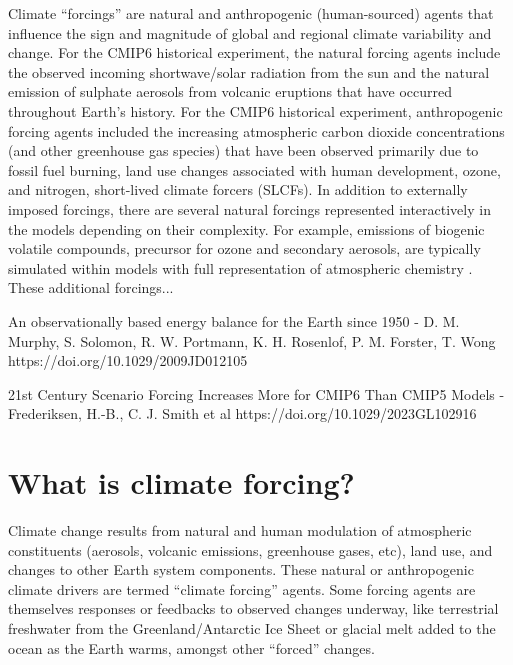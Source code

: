 \documentclass[gmd, preprint]{copernicus}
\newcommand{\mycomment}[1]{}
\begin{document}


\mycomment{Details about CMIP5 forcings can be found in https://pcmdi.llnl.gov/mips/cmip5/docs/Experiment_design_addendum.pdf}


\introduction  %
Climate “forcings” are natural and anthropogenic (human-sourced) agents that influence the sign and magnitude of global and regional climate variability and change. For the CMIP6 historical experiment, the natural forcing agents include the observed incoming shortwave/solar radiation from the sun and the natural emission of sulphate aerosols from volcanic eruptions that have occurred throughout Earth’s history. For the CMIP6 historical experiment, anthropogenic forcing agents included the increasing atmospheric carbon dioxide concentrations (and other greenhouse gas species) that have been observed primarily due to fossil fuel burning, land use changes associated with human development, ozone, and nitrogen, short-lived climate forcers (SLCFs). In addition to externally imposed forcings, there are several natural forcings represented interactively in the models depending on their complexity. For example, emissions of biogenic volatile compounds, precursor for ozone and secondary aerosols, are typically simulated within models with full representation of atmospheric chemistry \citep{thornhill_climate-driven_2021,young_pre-industrial_2013}. These additional forcings...


An observationally based energy balance for the Earth since 1950 - D. M. Murphy, S. Solomon, R. W. Portmann, K. H. Rosenlof, P. M. Forster, T. Wong https://doi.org/10.1029/2009JD012105

21st Century Scenario Forcing Increases More for CMIP6 Than CMIP5 Models - Frederiksen, H.-B., C. J. Smith et al https://doi.org/10.1029/2023GL102916



\section{What is climate forcing?}
Climate change results from natural and human modulation of atmospheric constituents (aerosols, volcanic emissions, greenhouse gases, etc), land use, and changes to other Earth system components. These natural or anthropogenic climate drivers are termed “climate forcing” agents. Some forcing agents are themselves responses or feedbacks to observed changes underway, like terrestrial freshwater from the Greenland/Antarctic Ice Sheet or glacial melt added to the ocean as the Earth warms, amongst other “forced” changes.
\end{document}
